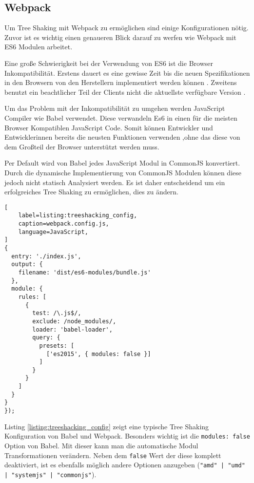 \subsection{Webpack}

Um Tree Shaking mit Webpack zu ermöglichen sind einige Konfigurationen nötig. 
Zuvor ist es wichtig einen genaueren Blick darauf zu werfen wie Webpack mit ES6 Modulen arbeitet.

Eine große Schwierigkeit bei der Verwendung von ES6 ist die Browser Inkompatibilität. Erstens dauert es eine gewisse Zeit bis die neuen Spezifikationen in den Browsern von den Herstellern implementiert werden können \autocite{CanIUseES6}. Zweitens benutzt ein beachtlicher Teil der Clients nicht die aktuellste verfügbare Version \autocite{CanIUseUsageTable}.

Um das Problem mit der Inkompatibilität zu umgehen werden JavaScript Compiler wie Babel verwendet. Diese verwandeln Es6 in einen für die meisten Browser Kompatiblen JavaScript Code. Somit können Entwickler und Entwicklerinnen bereits die neusten Funktionen verwenden ,ohne das diese von dem Großteil der Browser unterstützt werden muss.\autocite{Babel}

Per Default wird von Babel jedes JavaScript Modul in CommonJS konvertiert. Durch die dynamische Implementierung von CommonJS Modulen können diese jedoch nicht statisch Analysiert werden. Es ist daher entscheidend um ein erfolgreiches Tree Shaking zu ermöglichen, dies zu ändern.\autocite{Babel}

\begin{lstlisting}[
    label=listing:treeshacking_config,
	caption=webpack.config.js,
	language=JavaScript,
]
{
  entry: './index.js',
  output: {
    filename: 'dist/es6-modules/bundle.js'
  },
  module: {
    rules: [
      {
        test: /\.js$/,
        exclude: /node_modules/,
        loader: 'babel-loader',
        query: {
          presets: [
            ['es2015', { modules: false }]
          ]
        }
      }
    ]
  }
}
});
\end{lstlisting}

Listing \ref{listing:treeshacking_config} zeigt eine typische Tree Shaking Konfiguration von Babel und Webpack. Besonders wichtig ist die \lstinline{modules: false} Option von Babel. Mit dieser kann man die automatische Modul Transformationen verändern. Neben dem \lstinline{false} Wert der diese komplett deaktiviert, ist es ebenfalls möglich andere Optionen anzugeben (\lstinline{"amd" | "umd" | "systemjs" | "commonjs"}). \autocite{Babel}

